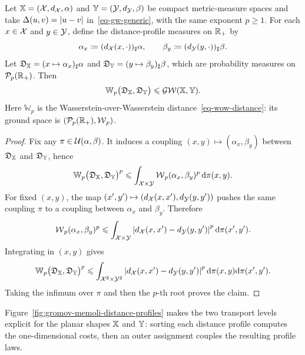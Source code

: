 \begin{prop}\label{prop-memoli-gw-profile-lower-bound}
	Let $\mathbb{X}=(\mathcal{X},d_{\mathcal{X}},\alpha)$ and $\mathbb{Y}=(\mathcal{Y},d_{\mathcal{Y}},\beta)$ be compact metric-measure spaces and take $\Delta(u,v)=|u-v|$ in~\eqref{eq-gw-generic}, with the same exponent $p\geq1$. For each $x\in\mathcal{X}$ and $y\in\mathcal{Y}$, define the distance-profile measures on $\mathbb{R}_+$ by
	\[
		\alpha_x\coloneqq(d_{\mathcal{X}}(x,\cdot))_\sharp\alpha,
		\qquad
		\beta_y\coloneqq(d_{\mathcal{Y}}(y,\cdot))_\sharp\beta.
	\]
	Let $\mathfrak D_{\mathbb{X}}=(x\mapsto\alpha_x)_\sharp\alpha$ and $\mathfrak D_{\mathbb{Y}}=(y\mapsto\beta_y)_\sharp\beta$, which are probability measures on $\mathcal{P}_p(\mathbb{R}_+)$. Then
	\[
		\mathbb W_p\bigl(\mathfrak D_{\mathbb{X}},\mathfrak D_{\mathbb{Y}}\bigr)
		\leqslant
		\operatorname{\mathcal{GW}}(\mathbb{X},\mathbb{Y}).
	\]
	Here $\mathbb W_p$ is the Wasserstein-over-Wasserstein distance~\eqref{eq-wow-distance}: its ground space is $(\mathcal{P}_p(\mathbb{R}_+),\operatorname{\mathcal{W}}_p)$.
\end{prop}
\begin{proof}
	Fix any $\pi\in\mathcal{U}(\alpha,\beta)$. It induces a coupling $(x,y)\mapsto(\alpha_x,\beta_y)$ between $\mathfrak D_{\mathbb{X}}$ and $\mathfrak D_{\mathbb{Y}}$, hence
	\[
		\mathbb W_p\bigl(\mathfrak D_{\mathbb{X}},\mathfrak D_{\mathbb{Y}}\bigr)^p
		\leqslant
		\int_{\mathcal{X}\times\mathcal{Y}}\operatorname{\mathcal{W}}_p(\alpha_x,\beta_y)^p\,\mathrm{d}\pi(x,y).
	\]
	For fixed $(x,y)$, the map $(x',y')\mapsto(d_{\mathcal{X}}(x,x'),d_{\mathcal{Y}}(y,y'))$ pushes the same coupling $\pi$ to a coupling between $\alpha_x$ and $\beta_y$. Therefore
	\[
		\operatorname{\mathcal{W}}_p(\alpha_x,\beta_y)^p
		\leqslant
		\int_{\mathcal{X}\times\mathcal{Y}}
		\left\lvert d_{\mathcal{X}}(x,x')-d_{\mathcal{Y}}(y,y')\right\rvert^p
		\mathrm{d}\pi(x',y').
	\]
	Integrating in $(x,y)$ gives
	\[
		\mathbb W_p\bigl(\mathfrak D_{\mathbb{X}},\mathfrak D_{\mathbb{Y}}\bigr)^p
		\leqslant
		\int_{\mathcal{X}^2\times\mathcal{Y}^2}
		\left\lvert d_{\mathcal{X}}(x,x')-d_{\mathcal{Y}}(y,y')\right\rvert^p
		\mathrm{d}\pi(x,y)\mathrm{d}\pi(x',y').
	\]
	Taking the infimum over $\pi$ and then the $p$-th root proves the claim.
\end{proof}

Figure~\ref{fig:gromov-memoli-distance-profiles} makes the two transport levels explicit for the planar shapes $\mathbb{X}$ and $\mathbb{Y}$: sorting each distance profile computes the one-dimensional costs, then an outer assignment couples the resulting profile laws.

